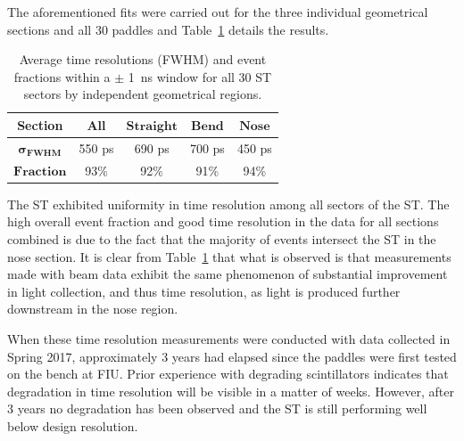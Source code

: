 
The aforementioned fits were carried out for the three individual geometrical sections and all 30 paddles and  Table~\ref{tab:time_res_section} details the results.
	\begin{table}[htbp]
		\centering
		\begin{tabular}{|c|c|c|c|c|}
			\hline  \textbf{Section} & $\mathbf{All}$ & $\mathbf{Straight}$ & $\mathbf{Bend}$ & $\mathbf{Nose}$ \\ 
			\hline $\mathbf{\sigma_{FWHM}}$ & 550 ps & 690 ps & 700 ps & 450 ps \\
			\hline $\mathbf{Fraction}$ & 93\% & 92\% & 91\% &  94\% \\ 
			\hline 
		\end{tabular}
		\caption{Average time resolutions (FWHM) and event fractions within a $\pm$ 1~ns window for all 30 ST sectors by independent geometrical regions.}
		\label{tab:time_res_section}
	\end{table}

The ST exhibited uniformity in time resolution among all sectors of the ST. The high overall event fraction and good time resolution in the data for all sections combined is due to the fact that the majority of events intersect the ST in the nose section. 
It is clear from Table~\ref{tab:time_res_section} that what is observed is that measurements made with beam data exhibit the same phenomenon of substantial improvement in light collection, and thus time resolution, as light is produced further downstream in the nose region.

When these time resolution measurements were conducted with data collected in Spring 2017, approximately 3 years had elapsed since the paddles were first tested on the bench at FIU.  Prior experience with degrading scintillators indicates that degradation in time resolution will be visible in a matter of weeks.  However, after 3 years no degradation has been observed and the ST is still performing well below design resolution.
